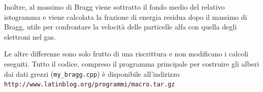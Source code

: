 \documentclass[italian,a4paper]{article}
\begin{document}
Inoltre, al massimo di Bragg viene sottratto il fondo medio del relativo
istogramma e viene calcolata la frazione di energia residua dopo il massimo
di Bragg, utile per confrontare la velocità delle particelle alfa con quella
degli elettroni nel gas.

Le altre differenze sono solo frutto di una riscrittura e non modificano i
calcoli eseguiti. Tutto il codice, compreso il programma principale per
costruire gli alberi dai dati grezzi (\texttt{my\_bragg.cpp}) è disponibile all'indirizzo
\texttt{http://www.latinblog.org/programmi/macro.tar.gz}
\end{document}
